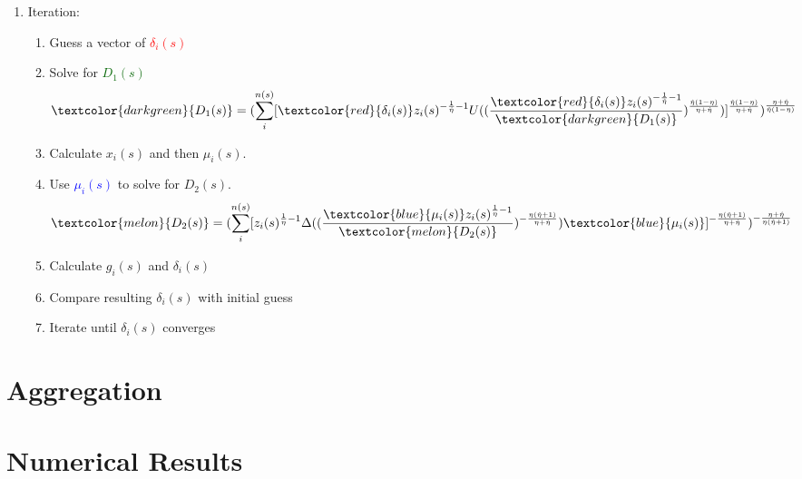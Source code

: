 \begin{enumerate}
    \item Iteration:
    \begin{enumerate}
        \item Guess a vector of \textcolor{red}{$\delta_i(s)$}
        \item Solve for \textcolor{darkgreen}{$D_1(s)$}
        \begin{align}
        \textcolor{darkgreen}{D_1(s)} = (\sum_i^{n(s)} [\textcolor{red}{\delta_i(s)} z_i(s)^{-\frac{1}{ \hat{\eta}}-1}U((\frac{\textcolor{red}{\delta_i(s)} z_i(s)^{-\frac{1}{\hat{\eta}}-1}}{\textcolor{darkgreen}{D_1(s)}})^{\frac{\hat{\eta}(1-\eta)}{\eta + \hat{\eta}}})]^{\frac{\hat{\eta}(1-\eta)}{\eta+\hat{\eta}}})^{\frac{\eta+\hat{\eta}  }{\hat{\eta}(1-\eta)}}
    \end{align}
        \item Calculate $x_i(s)$ and then $\mu_i(s)$.
    \item Use \textcolor{blue}{$\mu_i(s)$} to solve for \textcolor{melon}{$D_2(s)$}. 
    \begin{align}
         \textcolor{melon}{D_2(s)} = (\sum_i^{n(s)} [z_i(s)^{\frac{1}{\eta}-1}\Delta((\frac{\textcolor{blue}{\mu_i(s)} z_i(s)^{\frac{1}{\eta}-1}}{\textcolor{melon}{D_2(s)}})^{-\frac{\eta(\hat{\eta}+1)}{\eta+\hat{\eta}}})\textcolor{blue}{\mu_i(s)}]^{-\frac{\eta(\hat{\eta}+1)}{\eta+\hat{\eta}}})^{-\frac{\eta+\hat{\eta}}{\eta(\hat{\eta}+1)}}
    \end{align}
    \item Calculate $g_i(s)$ and $\delta_i(s)$
    \item Compare resulting $\delta_i(s)$ with initial guess 
    \item Iterate until $\delta_i(s)$ converges
    \end{enumerate}
\end{enumerate}

\section{Aggregation}


\section{Numerical Results}




